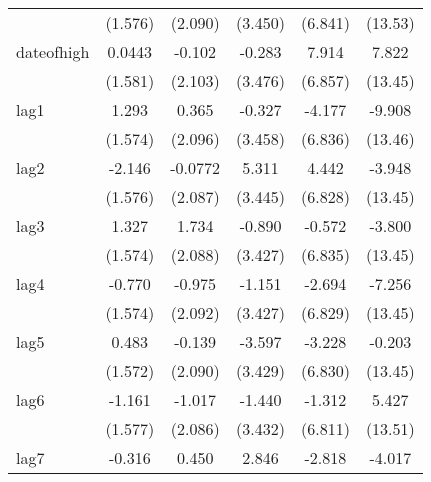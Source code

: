 {\begin{tabular}{l*{5}{c}}
            &     (1.576)         &     (2.090)         &     (3.450)         &     (6.841)         &     (13.53)         \\
[1em]
dateofhigh  &      0.0443         &      -0.102         &      -0.283         &       7.914         &       7.822         \\
            &     (1.581)         &     (2.103)         &     (3.476)         &     (6.857)         &     (13.45)         \\
[1em]
lag1        &       1.293         &       0.365         &      -0.327         &      -4.177         &      -9.908         \\
            &     (1.574)         &     (2.096)         &     (3.458)         &     (6.836)         &     (13.46)         \\
[1em]
lag2        &      -2.146         &     -0.0772         &       5.311         &       4.442         &      -3.948         \\
            &     (1.576)         &     (2.087)         &     (3.445)         &     (6.828)         &     (13.45)         \\
[1em]
lag3        &       1.327         &       1.734         &      -0.890         &      -0.572         &      -3.800         \\
            &     (1.574)         &     (2.088)         &     (3.427)         &     (6.835)         &     (13.45)         \\
[1em]
lag4        &      -0.770         &      -0.975         &      -1.151         &      -2.694         &      -7.256         \\
            &     (1.574)         &     (2.092)         &     (3.427)         &     (6.829)         &     (13.45)         \\
[1em]
lag5        &       0.483         &      -0.139         &      -3.597         &      -3.228         &      -0.203         \\
            &     (1.572)         &     (2.090)         &     (3.429)         &     (6.830)         &     (13.45)         \\
[1em]
lag6        &      -1.161         &      -1.017         &      -1.440         &      -1.312         &       5.427         \\
            &     (1.577)         &     (2.086)         &     (3.432)         &     (6.811)         &     (13.51)         \\
[1em]
lag7        &      -0.316         &       0.450         &       2.846         &      -2.818         &      -4.017         \\

\end{tabular}}
